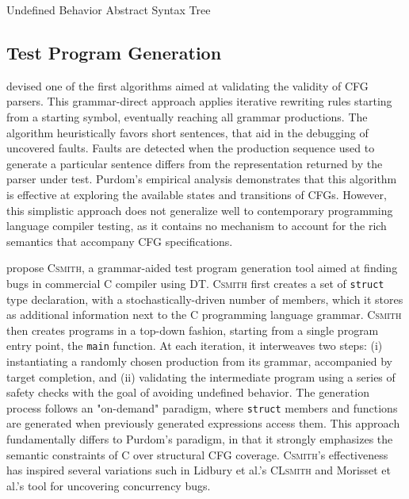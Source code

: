  {Undefined Behavior}
 {Abstract Syntax Tree}

\subsection{\label{subsec:tpg}Test Program Generation}

\citet{purdom1972sentence} devised one of the first algorithms aimed at
validating the validity of \gls{CFG} parsers.
This grammar-direct approach applies iterative rewriting rules
starting from a starting symbol, eventually reaching all grammar productions.
The algorithm heuristically favors short sentences, that aid in the
debugging of uncovered faults.
Faults are detected when the production sequence used to generate a particular
sentence differs from the representation returned by the parser under test.
Purdom's \cite{purdom1972sentence} empirical analysis demonstrates
that this algorithm is effective at exploring the available
states and transitions of \gls{CFG}s.
However, this simplistic approach does not generalize
well to contemporary programming language compiler testing,
as it contains no mechanism to account for the rich semantics
that accompany \gls{CFG} specifications.

\citet{yang2011finding} propose \textsc{Csmith}, a grammar-aided
test program generation tool aimed at finding bugs in commercial 
C compiler using \gls{DT}.
\textsc{Csmith} first creates a set of \texttt{struct} type
declaration, with a stochastically-driven  number of members, which 
it stores as additional information next to the C programming language grammar.
\textsc{Csmith} then creates programs in a top-down fashion, starting from a
single program entry point, the \texttt{main} function.
At each iteration, it interweaves two steps: (i) instantiating
a randomly chosen production from its grammar, accompanied
by target completion, and (ii) validating the intermediate program
using a series of safety checks with the goal of avoiding undefined behavior.
The generation process follows an "on-demand" paradigm, where \texttt{struct}
members and functions are generated when previously generated expressions
access them.
This approach fundamentally differs to Purdom's \cite{purdom1972sentence} paradigm,
in that it strongly emphasizes the semantic constraints of C over 
structural \gls{CFG} coverage.
\textsc{Csmith}'s effectiveness has inspired several variations such in
Lidbury et al.'s \textsc{CLsmith} \cite{lidbury2015many} and
Morisset et al.'s \cite{morisset2013compiler} tool for uncovering
concurrency bugs.

